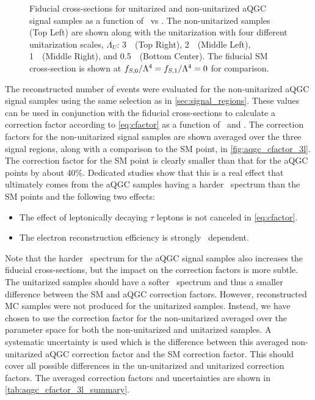 \begin{figure}[ht!]
\caption{Fiducial cross-sections for unitarized and non-unitarized aQGC signal samples as a function of \fszero~vs \fsone.
The non-unitarized samples (Top Left) are shown along with the unitarization with 
four different unitarization scales, $\Lambda_U$: 3~\TeV~(Top Right),
2~\TeV~(Middle Left), 1~\TeV~(Middle Right), and 0.5~\TeV~(Bottom Center).
The fiducial SM cross-section is shown at $f_{S,0}/\Lambda^4=f_{S,1}/\Lambda^4=0$ for comparison.}
\label{fig:aqgc_fiducial_xsec_3l}
\end{figure}



The reconstructed number of events were evaluated for the non-unitarized
aQGC signal samples using the same selection as in \sec\ref{sec:signal_regions}.
These values can be used in conjunction with the fiducial cross-sections
to calculate a correction factor according to \eqn\eqref{eq:cfactor} as a function 
of \fszero~and \fsone. The correction factors for the non-unitarized signal samples
are shown averaged over the three signal regions, along with a comparison to the SM point,
in \fig\ref{fig:aqgc_cfactor_3l}.
The correction factor for the SM point is clearly smaller than that for the aQGC
points by about 40\%. Dedicated studies show that this is a real effect 
that ultimately comes from the aQGC samples having a harder \pt~spectrum
than the SM points and the following two effects:
\begin{itemize}
\item The effect of leptonically decaying $\tau$ leptons is not 
canceled in \eqn\eqref{eq:cfactor}.
\item The electron reconstruction efficiency is strongly \pt~dependent.
\end{itemize}
Note that the harder \pt~spectrum for the aQGC signal samples also 
increases the fiducial cross-sections, but the impact on the correction factors is more subtle.
The unitarized samples should have a softer \pt~spectrum and thus a
smaller difference between the SM and aQGC correction factors. However,
reconstructed MC samples were not produced for the unitarized samples.
Instead, we have chosen to use the 
correction factor for the non-unitarized averaged over the parameter space for 
both the non-unitarized and unitarized samples.  A systematic uncertainty  
is used which is the difference between this averaged non-unitarized
aQGC correction factor and the SM correction factor. This should cover all possible differences
in the un-unitarized and unitarized correction factors. 
The averaged correction factors
and uncertainties are shown in \tab\ref{tab:aqgc_cfactor_3l_summary}.

